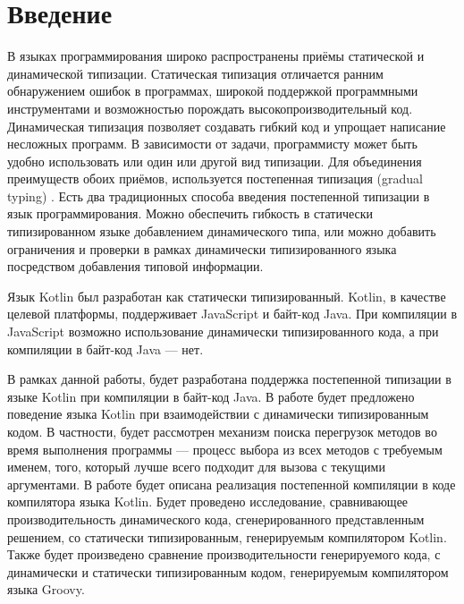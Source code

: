 \section*{Введение}

В языках программирования широко распространены приёмы статической и динамической типизации. Статическая типизация отличается ранним обнаружением ошибок в программах, широкой поддержкой программными инструментами и возможностью порождать высокопроизводительный код. Динамическая типизация позволяет создавать гибкий код и упрощает написание несложных программ. 
В зависимости от задачи, программисту может быть удобно использовать или один или другой вид типизации. Для объединения преимуществ обоих приёмов, используется постепенная типизация (gradual typing) \cite{gradual:siek2006gradual}. Есть два традиционных способа введения постепенной типизации в язык программирования. Можно обеспечить гибкость в статически типизированном языке добавлением динамического типа, или можно добавить ограничения и проверки в рамках динамически типизированного языка посредством добавления типовой информации.

Язык Kotlin был разработан как статически типизированный.
Kotlin, в качестве целевой платформы, поддерживает JavaScript и байт-код Java. При компиляции в JavaScript возможно использование динамически типизированного кода, а при компиляции в байт-код Java --- нет.

В рамках данной работы, будет разработана поддержка постепенной типизации в языке Kotlin при компиляции в байт-код Java. 
В работе будет предложено поведение языка Kotlin при взаимодействии с динамически типизированным кодом. В частности, будет рассмотрен механизм поиска перегрузок методов во время выполнения программы --- процесс выбора из всех методов с требуемым именем, того, который лучше всего подходит для вызова с текущими аргументами. В работе будет описана реализация постепенной компиляции в коде компилятора языка Kotlin. Будет проведено исследование, сравнивающее производительность динамического кода, сгенерированного представленным решением, со статически типизированным, генерируемым компилятором Kotlin. Также будет произведено сравнение производительности генерируемого кода, с динамически и статически типизированным кодом, генерируемым компилятором языка Groovy. 



